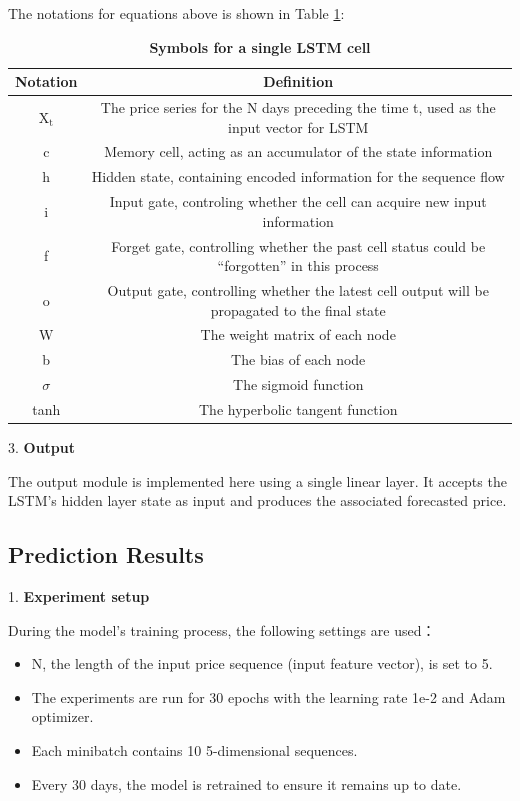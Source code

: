 \documentclass{mcmthesis}
\begin{document}
The notations for equations above is shown in Table \ref{Nota_LSTM}:
\begin{table}[H]
	\caption{\textbf{Symbols for a single LSTM cell}}%
	\label{Nota_LSTM}
	\centering%
	\begin{tabular}{cc}%
		\toprule%
		Notation&Definition \\
		\midrule%
		$\mathrm{X}_{\mathrm{t}}$&The price series for the N days preceding the time t, used as the input vector for LSTM \\
		c&Memory cell, acting as an accumulator of the state information \\
		h&Hidden state, containing encoded information for the sequence flow	\\
		i&Input gate, controling whether the cell can acquire new input information\\
		f&Forget gate, controlling whether the past cell status could be “forgotten” in this process	\\
		o&Output gate, controlling whether the latest cell output will be propagated to the final state  \\
		W&The weight matrix of each node	\\
		b&The bias of each node \\
		$\sigma$&The sigmoid function \\
		tanh&The hyperbolic tangent function	\\
		\bottomrule%
	\end{tabular}
\end{table}

3. \textbf{Output}

The output module is implemented here using a single linear layer. It accepts the LSTM's hidden layer state as input 
and produces the associated forecasted price.

\subsection{Prediction Results}
1. \textbf{Experiment setup}

	During the model's training process, the following settings are used：
	\begin{itemize}
		\item N, the length of the input price sequence (input feature vector), is set to 5.
		\item The experiments are run for 30 epochs with the learning rate 1e-2 and Adam optimizer.
		\item Each minibatch contains 10 5-dimensional sequences.
		\item Every 30 days, the model is retrained to ensure it remains up to date.
	\end{itemize}
\end{document}
